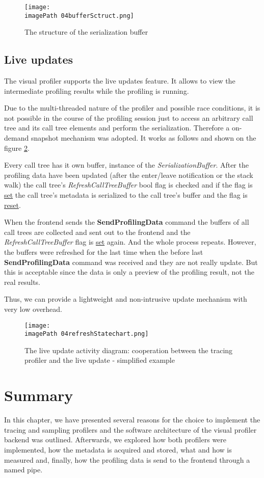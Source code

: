 \begin{figure}
	\centering
		\texttt{[image: \\imagePath 04bufferSctruct.png]}
		\caption{The structure of the serialization buffer }
	\label{fig:04bufferSctruct}
\end{figure}

\subsection{Live updates}
The visual profiler supports the live updates feature. It allows to view the intermediate profiling results while the profiling is running. 

Due to the multi-threaded nature of the profiler and possible race conditions, it is not possible in the course of the profiling session just to access an arbitrary call tree and its call tree elements and perform the serialization. Therefore a on-demand snapshot mechanism was adopted. It works as follows and shown on the figure \ref{fig:04refreshStatechart}. 

Every call tree has it own buffer, instance of the \textit{SerializationBuffer}. After the profiling data have been updated (after the enter/leave notification or the stack walk) the call tree's \textit{RefreshCallTreeBuffer} bool flag is checked and if the flag is \underline{set} the call tree's metadata is serialized to the call tree's buffer and the flag is \underline{reset}. 

When the frontend sends the \textbf{SendProfilingData} command the buffers of all call trees are collected and sent out to the frontend and the \textit{RefreshCallTreeBuffer} flag is \underline{set} again. And the whole process repeats. However, the buffers were refreshed for the last time when the before last \textbf{SendProfilingData} command was received and they are not really update. But this is acceptable since the data is only a preview of the profiling result, not the real results.

Thus, we can provide a lightweight and non-intrusive update mechanism with very low overhead. 

\begin{figure}
	\centering
		\texttt{[image: \\imagePath 04refreshStatechart.png]}
		\caption{The live update activity diagram: cooperation between the tracing profiler and the live update  - simplified example }
	\label{fig:04refreshStatechart}
\end{figure}

 
\section{Summary}
In this chapter, we have presented several reasons for the choice to implement the tracing and sampling profilers and the software architecture of the visual profiler backend was outlined. Afterwards, we explored how both profilers were implemented, how the metadata is acquired and stored, what and how is measured and, finally, how the profiling data is send to the frontend through a named pipe.






